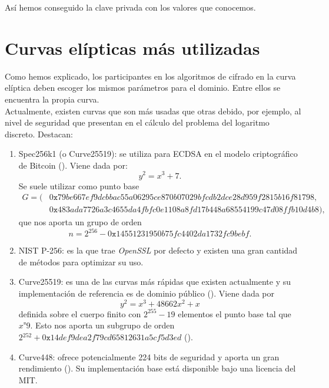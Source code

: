 \documentclass[11pt]{article}
\begin{document}
Así hemos conseguido la clave privada con los valores que conocemos.

\section{Curvas elípticas más utilizadas}
\label{sec:cur_usa}

Como hemos explicado, los participantes en los algoritmos de cifrado en la curva elíptica deben escoger los mismos parámetros para el dominio. Entre ellos se encuentra la propia curva.\\

Actualmente, existen curvas que son más usadas que otras debido, por ejemplo, al nivel de seguridad que presentan en el cálculo del problema del logaritmo discreto. Destacan:
\begin{enumerate}
\item Spec256k1 (o Curve25519): se utiliza para ECDSA en el modelo criptográfico de Bitcoin (\cite{Secp256k1}). Viene dada por:
\[
y^2 = x^3 + 7.
\]
Se suele utilizar como punto base
\begin{equation*}
\begin{split}
G = (&0\texttt{x}79be667ef9dcbbac55a06295ce870b07029bfcdb2dce28d959f2815b16f81798, \\
		&0\texttt{x}483ada7726a3c4655da4fbfc0e1108a8fd17b448a68554199c47d08ffb10d4b8),
\end{split}
\end{equation*}
que nos aporta un grupo de orden
\[
n =2^{256}-0\texttt{x}14551231950b75fc4402da1732fc9bebf.
\]

\item NIST P-256: es la que trae \textit{OpenSSL} por defecto y existen una gran cantidad de métodos para optimizar su uso. \\

\item Curve25519: es una de las curvas más rápidas que existen actualmente y su implementación de referencia es de dominio público (\cite{langley_elliptic_nodate}). Viene dada por
\[
y^2 = x^3 + 48662x^2 + x
\]
definida sobre el cuerpo finito con $ 2^{255} - 19 $ elementos el punto base tal que $ x ⁼ 9 $. Esto nos aporta un subgrupo de orden $ 2{^252 }+ 0\texttt{x}14def9dea2f79cd65812631a5cf5d3ed $ (\cite{curve25519}). \\

\item  Curve448: ofrece potencialmente 224 bits de seguridad y aporta un gran rendimiento (\cite{curve448}). Su implementación base está disponible bajo una licencia del MIT. \\
\end{enumerate}
\end{document}
